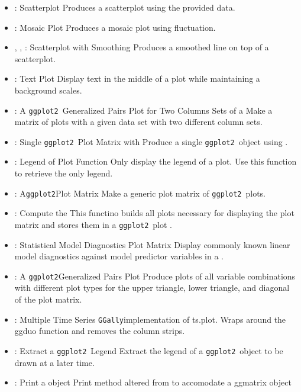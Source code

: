 \documentclass[stat,dissertation]{puthesis}\usepackage[]{graphicx}\usepackage{xcolor}
\newcommand{\pkg}[1]{\texttt{#1}}
\newcommand{\ggplot}{\pkg{ggplot2}}
\newcommand{\GGally}{\pkg{GGally}}
\newcommand{\tick}{\item[-]}
\begin{document}
\begin{itemize}
  \tick {}: Scatterplot \newline Produces a scatterplot using the provided data.
  \tick {}: Mosaic Plot \newline Produces a mosaic plot using fluctuation.
  \tick {}, , : Scatterplot with Smoothing \newline Produces a smoothed line on top of a scatterplot.
  \tick {}: Text Plot \newline Display text in the middle of a plot while maintaining a background scales.
  \tick {}: A \ggplot~Generalized Pairs Plot for Two Columns Sets of a  \newline Make a matrix of plots with a given data set with two different column sets.
  \tick {}: Single \ggplot~Plot Matrix with  \newline Produce a single \ggplot~object using .
  \tick {}: Legend of Plot Function \newline Only display the legend of a plot.  Use this function to retrieve the only legend.
  \tick {}: A\ggplot Plot Matrix \newline Make a generic plot matrix of \ggplot~plots.
  \tick {}: Compute the   \newline This functino builds all plots necessary for displaying the plot matrix and stores them in a \ggplot~plot .
  \tick {}: Statistical Model Diagnostics Plot Matrix \newline Display commonly known linear model diagnostics against model predictor variables in a .
  \tick {}:  A \ggplot Generalized Pairs Plot \newline Produce plots of all variable combinations with different plot types for the upper triangle, lower triangle, and diagonal of the plot matrix.
  \tick {}: Multiple Time Series \newline \GGally implementation of ts.plot. Wraps around the ggduo function and removes the column strips.
  \tick {}: Extract a \ggplot~Legend \newline Extract the legend of a \ggplot~object to be drawn at a later time.
  \tick {}: Print a  object \newline Print method altered from  to accomodate a ggmatrix object

\end{itemize}
\end{document}
